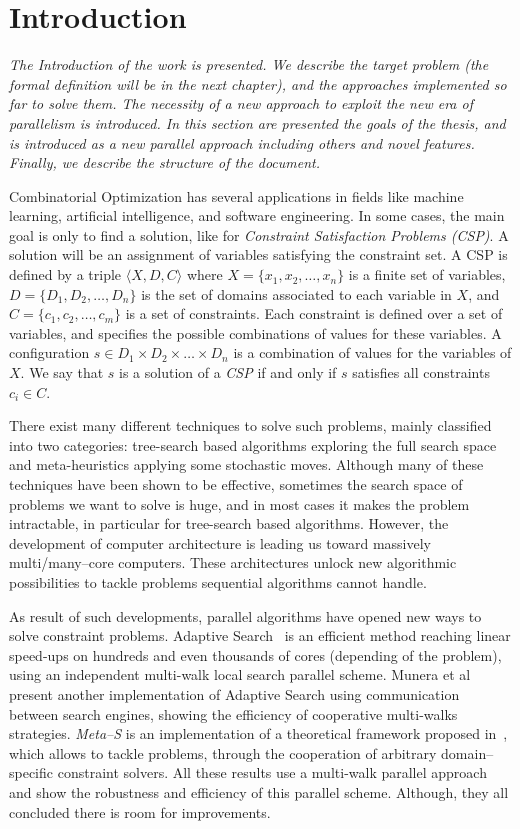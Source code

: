 \chapter{Introduction}
\label{chap:Intro}
\textit{The \textit{Introduction} of the work is presented. We describe the target problem (the formal definition will be in the next chapter), and the approaches implemented so far to solve them. The necessity of a new approach to exploit the new era of parallelism is introduced.
In this section are presented the goals of the thesis, and \posl{} is introduced as a new parallel approach including others and novel features. Finally, we describe the structure of the document.}
\vfill
\minitoc
\newpage

Combinatorial Optimization has several applications in fields like machine learning, artificial intelligence, and software engineering. In some cases, the main goal is only to find a solution, like for {\it Constraint Satisfaction Problems (CSP)}. A solution will be an assignment of variables satisfying the constraint set. A CSP is defined by a triple $\langle X,D,C \rangle$ where $X=\{x_1, x_2,\dots,x_n\}$ is a finite set of variables, $D = \{D_1, D_2,\dots, D_n\}$ is the set of domains associated to each variable in $X$, and $C = \{c_1, c_2,\dots,c_m\}$ is a set of constraints. Each constraint is defined over a set of variables, and specifies the possible combinations of values for these variables. A configuration $s\in D_1\times D_2\times\dots\times D_n$ is a combination of values for the variables of $X$. We say that $s$ is a solution of a {\it CSP} if and only if $s$ satisfies all constraints $c_i \in C$.

There exist many different techniques to solve such problems, mainly classified into two categories: tree-search based algorithms exploring the full search space and meta-heuristics applying some stochastic moves. Although many of these techniques have been shown to be effective, sometimes the search space of problems we want to solve is huge, and in most cases it makes the problem intractable, in particular for tree-search based algorithms. However, the development of computer architecture is leading us toward massively multi/many--core computers. These architectures unlock new algorithmic possibilities to tackle problems sequential algorithms cannot handle.

As result of such developments, parallel algorithms have opened new ways to solve constraint problems. Adaptive Search~\cite{Diaz} is an efficient method reaching linear speed-ups on hundreds and even thousands of cores (depending of the problem), using an independent multi-walk local search parallel scheme. Munera et al~\cite{Munera} present another implementation of Adaptive Search using communication between search engines, showing the efficiency of cooperative multi-walks strategies. {\it Meta--S} is an implementation of a theoretical framework proposed in~\cite{Frank2003}, which allows to tackle problems, through the cooperation of arbitrary domain--specific constraint solvers. All these results use a multi-walk parallel approach and show the robustness and efficiency of this parallel scheme. Although, they all concluded there is room for improvements. 

